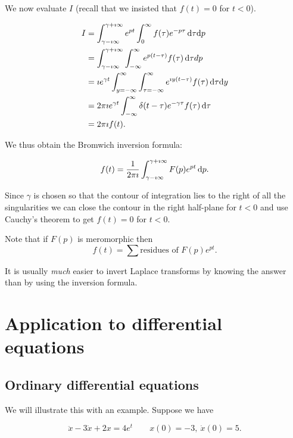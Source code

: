 \documentclass{notes}
\theoremstyle{plain}
\begin{document}
We now evaluate $I$ (recall that we insisted that $f(t) = 0$ for
$t < 0$).

\begin{align*}
I &= \int_{\gamma-\imath \infty}^{\gamma + \imath \infty}
e^{p t} \int_0^\infty f(\tau) e^{-p \tau}\, \mathrm{d} \tau \mathrm{d} p \\
&= \int_{\gamma-\imath \infty}^{\gamma + \imath \infty}
\int_{-\infty}^\infty e^{p(t-\tau)} f(\tau)\, \mathrm{d} \tau dp \\
&= \imath e^{\gamma t} \int_{y=-\infty}^\infty \int_{\tau = -\infty}^\infty
e^{\imath y ( t -\tau)} f(\tau)\, \mathrm{d} \tau \mathrm{d} y \\
&= 2 \pi \imath e^{\gamma t} \int_{-\infty}^\infty \delta(t-\tau)
e^{-\gamma \tau} f(\tau)\, \mathrm{d} \tau \\
&= 2 \pi \imath f(t).
\end{align*}

We thus obtain the Bromwich inversion formula:

\begin{equation}\label{eq:bromwich}
f(t) = \frac{1}{2 \pi \imath} \int_{\gamma - \imath \infty}^{\gamma
+ \imath \infty} F(p) e^{p t}\, \mathrm{d} p.
\end{equation}

Since $\gamma$ is chosen so that the contour of integration lies to
the right of all the singularities we can close the contour
in the right half-plane for $t < 0$ and use Cauchy's theorem to
get $f(t) = 0$ for $t < 0$.

Note that if $F(p)$ is meromorphic then
\[
f(t) = \sum \text{residues of } F(p) e^{p t}.
\]

It is usually \emph{much} easier to invert Laplace transforms by
knowing the answer than by using the inversion formula.

\section{Application to differential equations}

\subsection{Ordinary differential equations}

We will illustrate this with an example.  Suppose we have

\begin{equation}\label{eq:lapex}
\ddot{x}  - 3 \dot{x} + 2 x = 4 e^t \qquad x(0) = -3,\ \dot{x}(0) = 5.
\end{equation}
\end{document}
